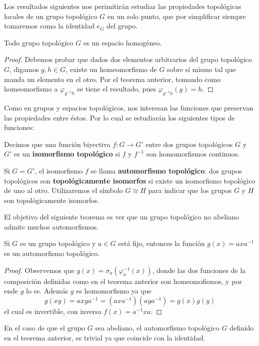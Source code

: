 \documentclass[12pt]{report}
\theoremstyle{largebreak}
\newcommand{\cf}[3]{\ensuremath{#1:#2\rightarrow#3}}
\begin{document}
    Los resultados siguientes nos perimitirán estudiar las propiedades topológicas locales de un grupo topológico $G$ en un solo punto, que por simplificar siempre tomaremos como la identidad $e_G$ del grupo.

    \begin{cor}
        Todo grupo topológico $G$ es un espacio homogéneo.
    \end{cor}

    \begin{proof}
        Debemos probar que dados dos elementos arbitrarios del grupo topológico $G$, digamos $g,h\in G$, existe un homeomorfismo de $G$ sobre sí mismo tal que manda un elemento en el otro. Por el teorema anterior, tomando como homeomorfismo a $\varphi_{g^{-1}h}$ se tiene el resultado, pues $\varphi_{g^{-1}h}(g)=h$.
    \end{proof}

    Como en grupos y espacios topológicos, nos interesan las funciones que preservan las propiedades entre éstos. Por lo cual se estudiarán los siguientes tipos de funciones:

    \begin{mydef}
        Decimos que una función biyectiva $\cf{f}{G}{G'}$ entre dos grupos topológicos $G$ y $G'$ es un \textbf{isomorfismo topológico} si $f$ y $f^{-1}$ son homomorfismos continuos.

        Si $G=G'$, el isomorfismo $f$ se llama \textbf{automorfismo topológico}. dos grupos topológicos son \textbf{topológicamente isomorfos} si existe un isomorfismo topológico de uno al otro. Utilizaremos el símbolo $G\cong H$ para indicar que los grupos $G$ y $H$ son topológicamente isomorfos.
    \end{mydef}

    El objetivo del siguiente teorema es ver que un grupo topológico no abeliano admite muchos automorfismos.

    \begin{theor}
        Si $G$ es un grupo topológico y $a\in G$ está fijo, entonces la función $g(x)=axa^{-1}$ es un automorfismo topológico.
    \end{theor}

    \begin{proof}
        Observemos que $g(x)=\sigma_a(\varphi_{a}^{-1}(x))$, donde las dos funciones de la composición definidas como en el teorema anterior son homeomofismos, y por ende $g$ lo es. Además $g$ es homomorfismo ya que
        \begin{equation}
            g(xy)=axya^{-1}=\left(axa^{-1}\right)\left(aya^{-1}\right)=g(x)g(y)
        \end{equation}
        el cual es invertible, con inversa $f(x)=a^{-1}xa$.
    \end{proof}

    \begin{obs}
        En el caso de que el grupo $G$ sea abeliano, el automorfismo topológico $G$ definido en el teorema anterior, es trivial ya que coincide con la identidad.
    \end{obs}
\end{document}
